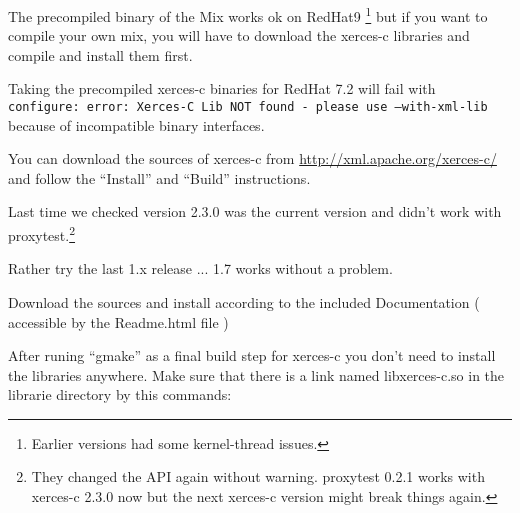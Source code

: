 \documentclass{article}
\begin{document}
The precompiled binary of the Mix works ok on RedHat9
\footnote{Earlier versions had some kernel-thread issues.} but if you
want to compile your own mix, you will have to download the xerces-c libraries and 
compile and install them first.

Taking the precompiled xerces-c binaries for RedHat 7.2 will fail with\\
\texttt{configure: error: Xerces-C Lib NOT found - please use --with-xml-lib}\\
because of incompatible binary interfaces.

You can download the sources of xerces-c from
\url{http://xml.apache.org/xerces-c/} and follow the ``Install'' and
``Build'' instructions.

Last time we checked version 2.3.0 was the current version and didn't
work with proxytest.\footnote{They changed the API again without
  warning. proxytest 0.2.1 works with xerces-c 2.3.0 now but the next
  xerces-c version might break things again.}

Rather try the last 1.x release ... 1.7 works without a problem.

Download the sources and install according to the included Documentation 
( accessible by the Readme.html file )


After runing ``gmake'' as a final build step for xerces-c you don't
need to install the libraries anywhere. 
Make sure that there is a link named libxerces-c.so in the librarie directory by this commands:
\end{document}
